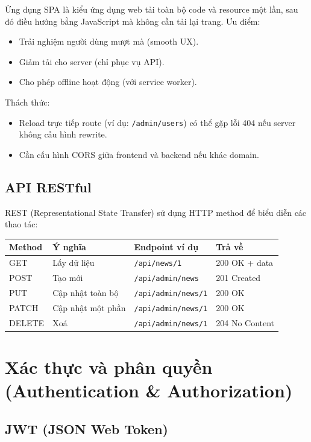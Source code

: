 \documentclass[12pt,a4paper,oneside]{report}
\begin{document}
Ứng dụng SPA là kiểu ứng dụng web tải toàn bộ code và resource một lần, sau đó điều hướng bằng JavaScript mà không cần tải lại trang.
Ưu điểm:
\begin{itemize}[itemsep=2pt]
  \item Trải nghiệm người dùng mượt mà (smooth UX).
  \item Giảm tải cho server (chỉ phục vụ API).
  \item Cho phép offline hoạt động (với service worker).
\end{itemize}

Thách thức:
\begin{itemize}[itemsep=2pt]
  \item Reload trực tiếp route (ví dụ: \texttt{/admin/users}) có thể gặp lỗi 404 nếu server không cấu hình rewrite.
  \item Cần cấu hình CORS giữa frontend và backend nếu khác domain.
\end{itemize}

\subsection{API RESTful}

REST (Representational State Transfer) sử dụng HTTP method để biểu diễn các thao tác:

\begin{center}
\begin{tabular}{|l|l|l|l|}
\hline
\textbf{Method} & \textbf{Ý nghĩa} & \textbf{Endpoint ví dụ} & \textbf{Trả về} \\
\hline
GET & Lấy dữ liệu & \texttt{/api/news/1} & 200 OK + data \\
\hline
POST & Tạo mới & \texttt{/api/admin/news} & 201 Created \\
\hline
PUT & Cập nhật toàn bộ & \texttt{/api/admin/news/1} & 200 OK \\
\hline
PATCH & Cập nhật một phần & \texttt{/api/admin/news/1} & 200 OK \\
\hline
DELETE & Xoá & \texttt{/api/admin/news/1} & 204 No Content \\
\hline
\end{tabular}
\end{center}

\section{Xác thực và phân quyền (Authentication \& Authorization)}

\subsection{JWT (JSON Web Token)}
\end{document}
